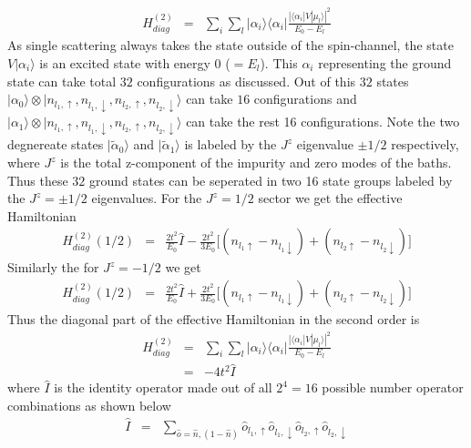 \documentclass[reprint,prb,superscriptaddress]{revtex4-1}
\begin{document}
\begin{eqnarray}
H^{(2)}_{diag} &=& \sum_{i} \sum_l |\alpha_i\rangle\langle \alpha_i | \frac{|\langle \alpha_i  | V| \mu_l \rangle|^2 }{E_0-E_{l}}
\end{eqnarray}
As single scattering always takes the state outside of the spin-channel, the state $V|\alpha_i\rangle$ is an excited state with energy $0$ ($=E_l$). This $\alpha_i$ representing the ground state can take total $32$ configurations as discussed. Out of this $32$ states $| {\alpha}_0\rangle\otimes |n_{l_1,\uparrow},n_{l_1,\downarrow},n_{l_2,\uparrow},n_{l_2,\downarrow}\rangle$ can take $16$ configurations and $| {\alpha}_1\rangle\otimes |n_{l_1,\uparrow},n_{l_1,\downarrow},n_{l_2,\uparrow},n_{l_2,\downarrow}\rangle$ can take the rest 16 configurations. Note the two degnereate states $|\tilde{\alpha}_0\rangle$  and $|\tilde{\alpha}_1\rangle$ is labeled by the $J^z$ eigenvalue $\pm 1/2$ respectively, where $J^z$ is the total z-component of the impurity and zero modes of the baths. Thus these $32$ ground states can be seperated in two 16 state groups labeled by the $J^z=\pm 1/2$ eigenvalues. For the $J^z=1/2$ sector we get the effective Hamiltonian
\begin{eqnarray}
H^{(2)}_{diag} (1/2) &=& \frac{2t^2}{E_0} \hat{I} - \frac{2t^2}{3E_0} \bigg[ (n_{l_1\uparrow}-n_{l_1\downarrow}) +(n_{l_2\uparrow}-n_{l_2\downarrow}) \bigg]
\end{eqnarray}
Similarly the for $J^z=-1/2$ we get 
\begin{eqnarray}
H^{(2)}_{diag} (1/2) &=& \frac{2t^2}{E_0} \hat{I} + \frac{2t^2}{3E_0} \bigg[ (n_{l_1\uparrow}-n_{l_1\downarrow}) +(n_{l_2\uparrow}-n_{l_2\downarrow}) \bigg]
\end{eqnarray}
Thus the diagonal part of the effective Hamiltonian in the second order is 
\begin{eqnarray}
H^{(2)}_{diag} &=& \sum_{i} \sum_l |\alpha_i\rangle\langle \alpha_i | \frac{|\langle \alpha_i  | V| \mu_l \rangle|^2 }{E_0-E_{l}} \nonumber\\
&=& -4t^2 \hat{I}
\end{eqnarray}
where $\hat{I}$ is the identity operator made out of all $2^4=16$ possible number operator combinations as shown below
\begin{eqnarray}
\hat{I} &=& \sum_{\hat{o}=\hat{n},(1-\hat{n})} \hat{o}_{l_1,\uparrow}\hat{o}_{l_1,\downarrow} \hat{o}_{l_2,\uparrow}\hat{o}_{l_2,\downarrow}
\end{eqnarray}
\end{document}
